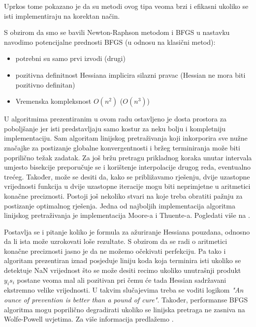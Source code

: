 \documentclass[bosnian,12pt,a4paper]{report}
\begin{document}
	\vspace{0.5cm}	
	\justify
	Uprkos tome pokazano je da su metodi ovog tipa veoma brzi i efikasni ukoliko se isti implementiraju na korektan način. 
	
	\vspace{0.5cm}
	\justify
	S obzirom da smo se bavili Newton-Raphson metodom i BFGS u nastavku navodimo potencijalne prednosti BFGS (u odnosu na klasični metod):
	
	\begin{itemize}
		\item potrebni su samo prvi izvodi (drugi)
		\item pozitivna definitnost Hessiana implicira silazni pravac (Hessian ne mora biti pozitivno definitan)
		\item Vremenska kompleksnost $O(n^2)$ ($O(n^3)$)
	\end{itemize}
	\justify
	
	
	\justify
	U algoritmima prezentiranim u ovom radu ostavljeno je dosta prostora za poboljšanje jer isti predstavljaju samo kostur za neku bolju i kompletniju implementaciju. Sam algoritam linijskog pretraživanja koji inkorporira sve nužne značajke za postizanje globalne konvergentnosti i bržeg terminiranja može biti poprilično težak zadatak. Za još bržu pretragu prikladnog koraka unutar intervala umjesto bisekcije preporučuje se i korištenje interpolacije drugog reda, eventualno trećeg. Također, može se desiti da, kako se približavamo rješenju, dvije uzastopne vrijednosti funkcija u dvije uzastopne iteracije mogu biti neprimjetne u aritmetici konačne preciznosti. Postoji još nekoliko stvari na koje treba obratiti pažnju za postizanje optimalnog rješenja. Jedna od najboljih implementacija algoritma linijskog pretraživanja je implementacija Moore-a i Thuente-a. Pogledati više na \cite{morethuente}.
	
	\justify
	Postavlja se i pitanje koliko je formula za ažuriranje Hessiana pouzdana, odnosno da li ista može uzrokovati loše rezultate. S obzirom da se radi o aritmetici konačne preciznosti jasno je da ne možemo očekivati perfekciju. Pa tako i algoritam prezentiran iznad posjeduje liniju koda koja terminira isti ukoliko se detektuje NaN vrijednost što se može desiti recimo ukoliko unutrašnji produkt $y_i s_i$ postane veoma mal ali pozitivan pri čemu će tada Hessian sadržavani ekstremno velike vrijednosti. U takvim slučajevima treba se voditi logikom \textit{"An ounce of prevention is better than a pound of cure"}. Također, performanse BFGS algoritma mogu poprilično degradirati ukoliko se linijska pretraga ne zasniva na Wolfe-Powell uvjetima. Za više informacija predlažemo \cite{nocedalwright}.
	
\end{document}
